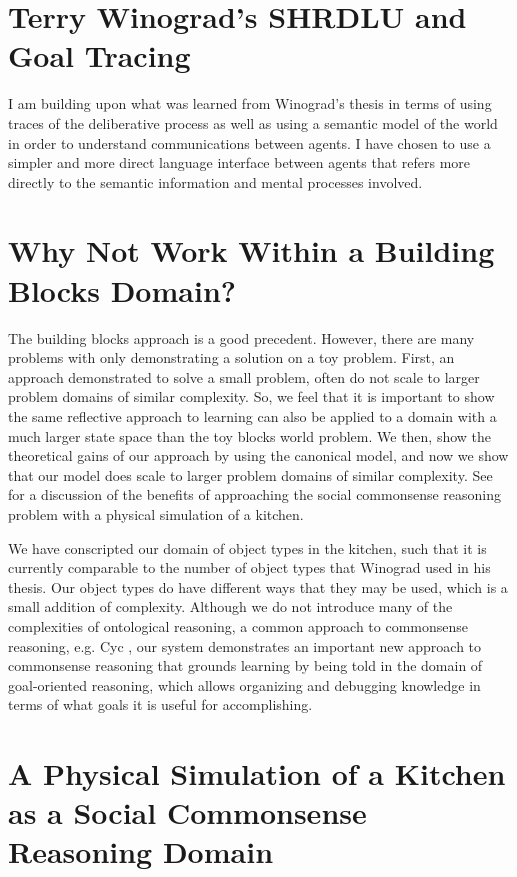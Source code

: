 \section{Terry Winograd's SHRDLU and Goal Tracing}

I am building upon what was learned from Winograd's thesis
\citep{winograd:1970} in terms of using traces of the deliberative
process as well as using a semantic model of the world in order to
understand communications between agents.  I have chosen to use a
simpler and more direct language interface between agents that refers
more directly to the semantic information and mental processes
involved.

\section{Why Not Work Within a Building Blocks Domain?}

The building blocks approach is a good precedent.  However, there are
many problems with only demonstrating a solution on a toy problem.
First, an approach demonstrated to solve a small problem, often do not
scale to larger problem domains of similar complexity.  So, we feel
that it is important to show the same reflective approach to learning
can also be applied to a domain with a much larger state space than
the toy blocks world problem.  We then, show the theoretical gains of
our approach by using the canonical model, and now we show that our
model does scale to larger problem domains of similar complexity.  See
\cite{smith:2010} for a discussion of the benefits of approaching the
social commonsense reasoning problem with a physical simulation of a
kitchen.

We have conscripted our domain of object types in the kitchen, such
that it is currently comparable to the number of object types that
Winograd used in his thesis.  Our object types do have different ways
that they may be used, which is a small addition of complexity.
Although we do not introduce many of the complexities of ontological
reasoning, a common approach to commonsense reasoning, e.g. Cyc
\citep{lenat:1990}, our system demonstrates an important new approach
to commonsense reasoning that grounds learning by being told in the
domain of goal-oriented reasoning, which allows organizing and
debugging knowledge in terms of what goals it is useful for
accomplishing.

\section{A Physical Simulation of a Kitchen as a Social Commonsense Reasoning Domain}

